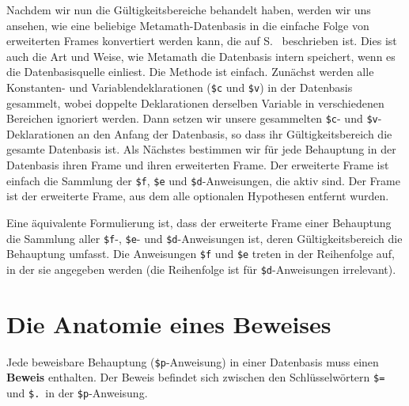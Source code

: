 Nachdem wir nun die Gültigkeitsbereiche behandelt haben, werden wir uns ansehen, wie eine beliebige Metamath-Datenbasis in die einfache Folge von erweiterten Frames konvertiert werden kann, die auf S.~\pageref{framelist} beschrieben ist.  Dies ist auch die Art und Weise, wie Metamath die Datenbasis intern speichert, wenn es die Datenbasisquelle einliest.\label{frameconvert} Die Methode ist einfach.  Zunächst werden alle Konstanten- und Variablendeklarationen (\texttt{\$c} und \texttt{\$v}) in der Datenbasis gesammelt, wobei doppelte Deklarationen derselben Variable in verschiedenen Bereichen ignoriert werden.  Dann setzen wir unsere gesammelten \texttt{\$c}- und \texttt{\$v}-Deklarationen an den Anfang der Datenbasis, so dass ihr Gültigkeitsbereich die gesamte Datenbasis ist.  Als Nächstes bestimmen wir für jede Behauptung in der Datenbasis ihren Frame und ihren erweiterten Frame.  Der erweiterte Frame ist einfach die Sammlung der \texttt{\$f}, \texttt{\$e} und \texttt{\$d}-Anweisungen, die aktiv sind.  Der Frame ist der erweiterte Frame, aus dem alle optionalen Hypothesen entfernt wurden.

Eine äquivalente Formulierung ist, dass der erweiterte Frame einer Behauptung die Sammlung aller \texttt{\$f}-, \texttt{\$e}- und \texttt{\$d}-Anweisungen ist, deren Gültigkeitsbereich die Behauptung umfasst. Die Anweisungen \texttt{\$f} und \texttt{\$e} treten in der Reihenfolge auf, in der sie angegeben werden (die Reihenfolge ist für \texttt{\$d}-Anweisungen irrelevant).


\section{Die Anatomie eines Beweises} \label{proof}

Jede beweisbare Behauptung (\texttt{\$p}-Anweisung) in einer Datenbasis muss einen {\bf Beweis} enthalten.  Der Beweis befindet sich zwischen den Schlüsselwörtern \texttt{\$=} und \texttt{\$.}\ in der \texttt{\$p}-Anweisung.

